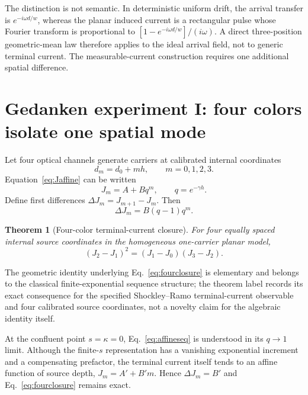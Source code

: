 \documentclass[11pt]{article}
\newtheorem{theorem}{Theorem}
\begin{document}
The distinction is not semantic. In deterministic uniform drift, the arrival transfer is $e^{-i\omega d/w}$, whereas the planar induced current is a rectangular pulse whose Fourier transform is proportional to $[1-e^{-i\omega d/w}]/(i\omega)$. A direct three-position geometric-mean law therefore applies to the ideal arrival field, not to generic terminal current. The measurable-current construction requires one additional spatial difference.

\section{Gedanken experiment I: four colors isolate one spatial mode}

Let four optical channels generate carriers at calibrated internal coordinates
\begin{equation}
d_m=d_0+mh,
\qquad m=0,1,2,3.
\label{eq:fourcoords}
\end{equation}
Equation~\eqref{eq:Jaffine} can be written
\begin{equation}
J_m=A+Bq^m,
\qquad q=e^{-\gamma h}.
\label{eq:affineseq}
\end{equation}
Define first differences $\Delta J_m=J_{m+1}-J_m$. Then
\begin{equation}
\Delta J_m=B(q-1)q^m.
\label{eq:firstdiff}
\end{equation}

\begin{theorem}[Four-color terminal-current closure]
For four equally spaced internal source coordinates in the homogeneous one-carrier planar model,
\begin{equation}
\boxed{(J_2-J_1)^2=(J_1-J_0)(J_3-J_2).}
\label{eq:fourclosure}
\end{equation}
\end{theorem}

The geometric identity underlying Eq.~\eqref{eq:fourclosure} is elementary and belongs to the classical finite-exponential sequence structure; the theorem label records its exact consequence for the specified Shockley--Ramo terminal-current observable and four calibrated source coordinates, not a novelty claim for the algebraic identity itself.

At the confluent point $s=\kappa=0$, Eq.~\eqref{eq:affineseq} is understood in its $q\to1$ limit. Although the finite-$s$ representation has a vanishing exponential increment and a compensating prefactor, the terminal current itself tends to an affine function of source depth, $J_m=A'+B'm$. Hence $\Delta J_m=B'$ and Eq.~\eqref{eq:fourclosure} remains exact.
\end{document}
